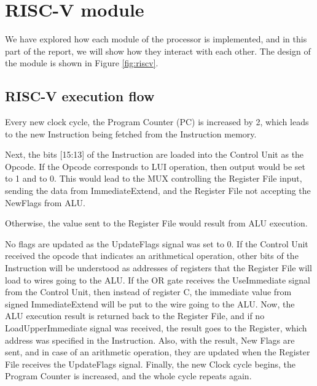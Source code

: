 \section{RISC-V module}
We have explored how each module of the processor is implemented, and in this part of the report, we will show how they interact with each other. The design of the module is shown in Figure \ref{fig:riscv}.

\subsection{RISC-V execution flow}
Every new clock cycle, the Program Counter (PC) is increased by 2, which leads to the new Instruction being fetched from the Instruction memory.

Next, the bits [15:13] of the Instruction are loaded into the Control Unit as the Opcode. If the Opcode corresponds to LUI operation, then  output would be set to 1 and  to 0. This would lead to the MUX controlling the Register File input, sending the data from ImmediateExtend, and the Register File not accepting the NewFlags from ALU.

Otherwise, the value sent to the Register File would result from ALU execution.

No flags are updated as the UpdateFlags signal was set to 0. If the Control Unit received the opcode that indicates an arithmetical operation, other bits of the Instruction will be understood as addresses of registers that the Register File will load to wires going to the ALU. If the OR gate receives the UseImmediate signal from the Control Unit, then instead of register C, the immediate value from signed ImmediateExtend will be put to the wire going to the ALU. Now, the ALU execution result is returned back to the Register File, and if no LoadUpperImmediate signal was received, the result goes to the Register, which address was specified in the Instruction. Also, with the result, New Flags are sent, and in case of an arithmetic operation, they are updated when the Register File receives the UpdateFlags signal. Finally, the new Clock cycle begins, the Program Counter is increased, and the whole cycle repeats again.